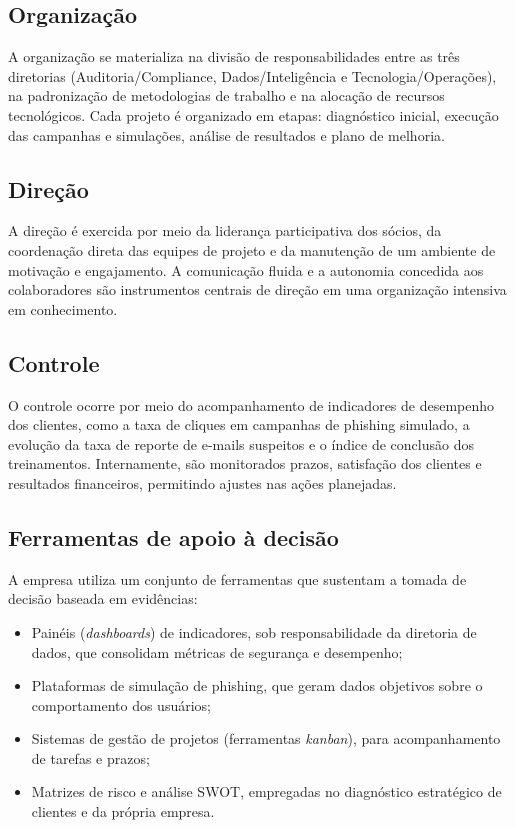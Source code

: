 \documentclass[12pt,a4paper]{article}
\begin{document}
\subsection{Organização}

A organização se materializa na divisão de responsabilidades entre as três
diretorias (Auditoria/Compliance, Dados/Inteligência e Tecnologia/Operações),
na padronização de metodologias de trabalho e na alocação de recursos
tecnológicos. Cada projeto é organizado em etapas: diagnóstico inicial,
execução das campanhas e simulações, análise de resultados e plano de melhoria.

\subsection{Direção}

A direção é exercida por meio da liderança participativa dos sócios, da
coordenação direta das equipes de projeto e da manutenção de um ambiente de
motivação e engajamento. A comunicação fluida e a autonomia concedida aos
colaboradores são instrumentos centrais de direção em uma organização
intensiva em conhecimento.

\subsection{Controle}

O controle ocorre por meio do acompanhamento de indicadores de desempenho dos
clientes, como a taxa de cliques em campanhas de phishing simulado, a evolução
da taxa de reporte de e-mails suspeitos e o índice de conclusão dos
treinamentos. Internamente, são monitorados prazos, satisfação dos clientes e
resultados financeiros, permitindo ajustes nas ações planejadas.

\subsection{Ferramentas de apoio à decisão}

A empresa utiliza um conjunto de ferramentas que sustentam a tomada de decisão
baseada em evidências:

\begin{itemize}[noitemsep]
  \item Painéis (\textit{dashboards}) de indicadores, sob responsabilidade da
        diretoria de dados, que consolidam métricas de segurança e desempenho;
  \item Plataformas de simulação de phishing, que geram dados objetivos sobre o
        comportamento dos usuários;
  \item Sistemas de gestão de projetos (ferramentas \textit{kanban}), para
        acompanhamento de tarefas e prazos;
  \item Matrizes de risco e análise SWOT, empregadas no diagnóstico estratégico
        de clientes e da própria empresa.
\end{itemize}
\end{document}
